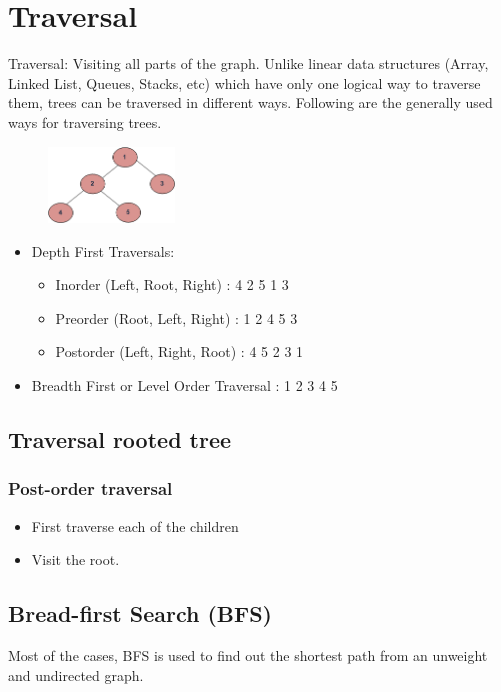 \documentclass[en,hazy,blue,screen,14pt]{elegantnote}
\begin{document}
\section{Traversal}
Traversal: Visiting all parts of the graph. Unlike linear data structures (Array, Linked List, Queues, Stacks, etc) which have only one logical way to traverse them, trees can be traversed in different ways. Following are the generally used ways for traversing trees.

\begin{figure}[H]
\centering
\includegraphics[width=0.3\textwidth]{tree12.png}
\end{figure}

\begin{itemize}
\item Depth First Traversals:
    \begin{itemize}
     \item Inorder (Left, Root, Right) : 4 2 5 1 3
     \item Preorder (Root, Left, Right) : 1 2 4 5 3
     \item Postorder (Left, Right, Root) : 4 5 2 3 1
    \end{itemize}
\item Breadth First or Level Order Traversal : 1 2 3 4 5

\end{itemize}

\subsection{Traversal rooted tree}
\subsubsection{Post-order traversal}
\begin{itemize}
\item First traverse each of the children 
\item Visit the root.
\end{itemize}
\subsection{Bread-first Search (BFS)}
Most of the cases, BFS is used to find out the shortest path from an unweight 
and undirected graph.
\end{document}
